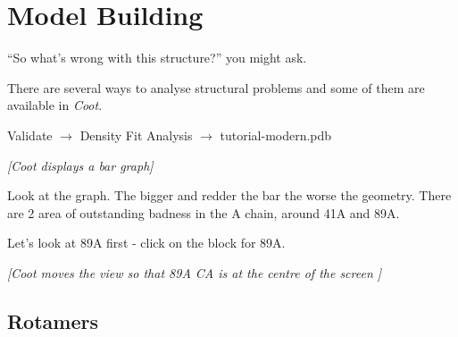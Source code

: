 \documentclass{article}
\begin{document}

\section{Model Building}

``So what's wrong with this structure?'' you might ask.

There are several ways to analyse structural problems and some of them
are available in \emph{Coot}.

\begin{trivlist}
\item \textsf{Validate $\rightarrow$ Density Fit Analysis $\rightarrow$ tutorial-modern.pdb}

\textsl{ [\emph{Coot} displays a bar graph]}

\item Look at the graph.  The bigger and redder the bar the worse the
  geometry. There are 2 area of outstanding badness in the A chain,
  around 41A and 89A.
\item Let's look at 89A first - click on the block for 89A.
\end{trivlist}

\textsl{ [\emph{Coot} moves the view so that 89A CA is at the centre of the
  screen ]}

\subsection{Rotamers}
\end{document}
